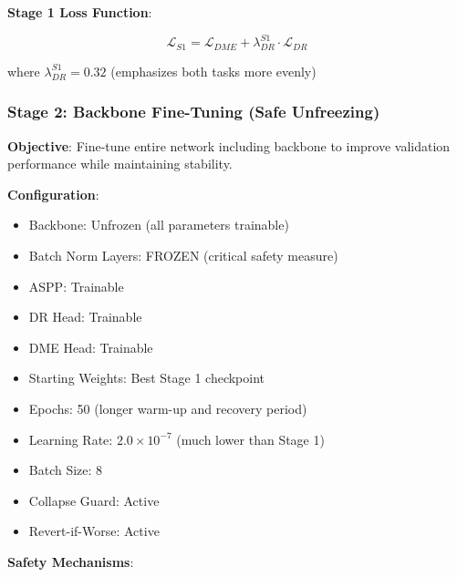 \textbf{Stage 1 Loss Function}:

\begin{equation}
\mathcal{L}_{S1} = \mathcal{L}_{DME} + \lambda_{DR}^{S1} \cdot \mathcal{L}_{DR}
\end{equation}

where $\lambda_{DR}^{S1}=0.32$ (emphasizes both tasks more evenly)

\subsubsection{Stage 2: Backbone Fine-Tuning (Safe Unfreezing)}

\textbf{Objective}: Fine-tune entire network including backbone to improve validation performance while maintaining stability.

\textbf{Configuration}:
\begin{itemize}
    \item Backbone: Unfrozen (all parameters trainable)
    \item Batch Norm Layers: FROZEN (critical safety measure)
    \item ASPP: Trainable
    \item DR Head: Trainable
    \item DME Head: Trainable
    \item Starting Weights: Best Stage 1 checkpoint
    \item Epochs: 50 (longer warm-up and recovery period)
    \item Learning Rate: $2.0 \times 10^{-7}$ (much lower than Stage 1)
    \item Batch Size: 8
    \item Collapse Guard: Active
    \item Revert-if-Worse: Active
\end{itemize}

\textbf{Safety Mechanisms}:

